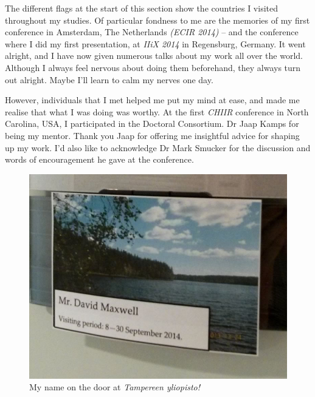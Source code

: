 \begin{preamble}
The different flags at the start of this section show the countries I visited throughout my studies. Of particular fondness to me are the memories of my first conference in Amsterdam, The Netherlands \emph{(ECIR 2014)} -- and the conference where I did my first presentation, at \emph{IIiX 2014} in Regensburg, Germany. It went alright, and I have now given numerous talks about my work all over the world. Although I always feel nervous about doing them beforehand, they always turn out alright. Maybe I'll learn to calm my nerves one day.

However, individuals that I met helped me put my mind at ease, and made me realise that what I was doing was worthy. At the first \emph{CHIIR} conference in North Carolina, USA, I participated in the Doctoral Consortium. Dr Jaap Kamps for being my mentor. Thank you Jaap for offering me insightful advice for shaping up my work. I'd also like to acknowledge Dr Mark Smucker for the discussion and words of encouragement he gave at the conference.

\renewcommand{\figurename}{Picture}
\begin{figure}
    \begin{center}
    \vspace*{-9mm}
    \includegraphics[width=1\textwidth]{figures/ch0-tampere.jpg}
    \end{center}
    \vspace*{-6mm}
    \caption{My name on the door at \emph{Tampereen yliopisto!}}
    \label{fig:acks_finland}
\end{figure}
\renewcommand{\figurename}{Figure}


\end{preamble}
